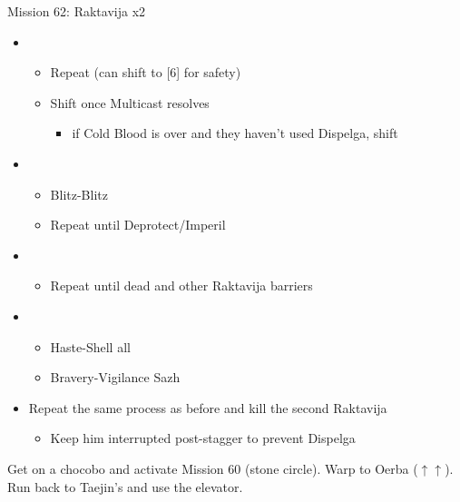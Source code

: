 \begin{battle}{Mission 62: Raktavija x2}
\begin{itemize}
\begin{itemize}
\begin{itemize}
					\end{itemize}
			\end{itemize}
		\item \third
			\begin{itemize}
				\item Repeat (can shift to [6] for safety)
				\item Shift once Multicast resolves
					\begin{itemize}
						\item if Cold Blood is over and they haven't used Dispelga, shift
					\end{itemize}
			\end{itemize}
		\item \first
			\begin{itemize}
				\item Blitz-Blitz
				\item Repeat until Deprotect/Imperil
			\end{itemize}
		\item \second
			\begin{itemize}
				\item Repeat until dead and other Raktavija barriers
			\end{itemize}
		\item \fifth
			\begin{itemize}
				\item Haste-Shell all
				\item Bravery-Vigilance Sazh
			\end{itemize}
		\item Repeat the same process as before and kill the second Raktavija
			\begin{itemize}
				\item Keep him interrupted post-stagger to prevent Dispelga
			\end{itemize}
	\end{itemize}
\end{battle}

Get on a chocobo and activate Mission 60 (stone circle).
Warp to Oerba ($\uparrow\uparrow$).
Run back to Taejin's and use the elevator.

